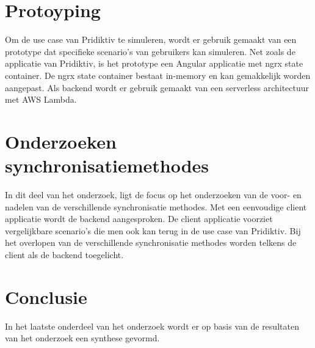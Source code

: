 \section{Protoyping}
Om de use case van Pridiktiv te simuleren, wordt er gebruik gemaakt van een prototype dat specifieke scenario's van gebruikers kan simuleren. Net zoals de applicatie van Pridiktiv, is het prototype een Angular applicatie met ngrx state container. De ngrx state container bestaat in-memory en kan gemakkelijk worden aangepast. Als backend wordt er gebruik gemaakt van een serverless architectuur met AWS Lambda.
\section{Onderzoeken synchronisatiemethodes}
In dit deel van het onderzoek, ligt de focus op het onderzoeken van de voor- en nadelen van de verschillende synchronisatie methodes. Met een eenvoudige client applicatie wordt de backend aangesproken. De client applicatie voorziet vergelijkbare scenario's die men ook kan terug in de use case van Pridiktiv. Bij het overlopen van de verschillende synchronisatie methodes worden telkens de client als de backend toegelicht.
\section{Conclusie}
In het laatste onderdeel van het onderzoek wordt er op basis van de resultaten van het onderzoek een synthese gevormd.
